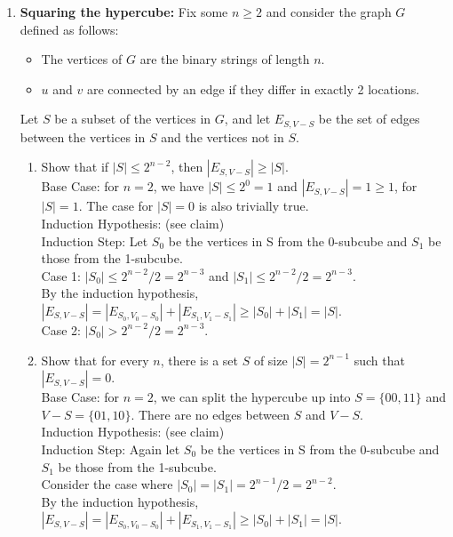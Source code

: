 \documentclass[11pt,fleqn]{article}
\begin{document}
\begin{enumerate}
\begin{enumerate}
\end{enumerate}

\newpage
\item \textbf{Squaring the hypercube:} Fix some $n \geq 2$ and consider the graph $G$ defined as follows:

\begin{itemize}
\item The vertices of $G$ are the binary strings of length $n$.
\item $u$ and $v$ are connected by an edge if they differ in exactly 2 locations.
\end{itemize}

Let $S$ be a subset of the vertices in $G$, and let $E_{S, V-S}$ be the set of edges between
the vertices in $S$ and the vertices not in $S$.
\begin{enumerate}
\item Show that if $|S| \leq 2^{n-2}$, then $|E_{S, V-S}| \geq |S|$. \\
Base Case: for $n=2$, we have $|S| \leq 2^0 = 1$ and $|E_{S, V-S}| = 1 \geq 1$, for $|S| = 1$. The case for $|S| = 0$ is also trivially true. \\
Induction Hypothesis: (see claim) \\
Induction Step: Let $S_0$ be the vertices in S from the 0-subcube and $S_1$ be those from the 1-subcube. \\
Case 1: $|S_0| \leq 2^{n-2}/2 = 2^{n-3}$ and $|S_1| \leq 2^{n-2}/2 = 2^{n-3}$. \\
By the induction hypothesis, $|E_{S,V-S}| = |E_{S_0,V_0-S_0}| + |E_{S_1,V_1-S_1}| \geq |S_0| + |S_1| = |S|$. \\
Case 2: $|S_0| > 2^{n-2}/2 = 2^{n-3}$.
\item Show that for every $n$, there is a set $S$ of size $|S| = 2^{n-1}$
such that $|E_{S, V-S}| = 0$. \\
Base Case: for $n=2$, we can split the hypercube up into $S = \{00,11\}$ and $V-S = \{01,10\}$. There are no edges between $S$ and $V-S$. \\
Induction Hypothesis: (see claim) \\
Induction Step: Again let $S_0$ be the vertices in S from the 0-subcube and $S_1$ be those from the 1-subcube. \\
Consider the case where $|S_0| = |S_1| = 2^{n-1}/2 = 2^{n-2}$. \\
By the induction hypothesis, $|E_{S,V-S}| = |E_{S_0,V_0-S_0}| + |E_{S_1,V_1-S_1}| \geq |S_0| + |S_1| = |S|$. \\
\end{enumerate}


\end{enumerate}
\end{document}
